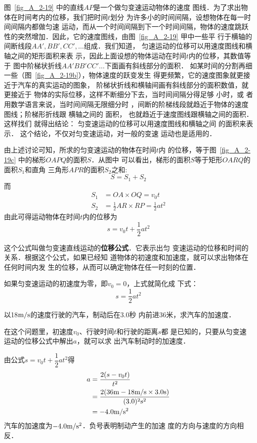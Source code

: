     图~\ref{fig_A_2-19} 中的直线$AP$是一个做匀变速运动物体的速度
图线．为了求出物体在时间考内的位移，我们把时间$t$划分
为许多小的时间间隔，设想物体在每一时间间隔内都做匀速
运动，而从一个时间间隔到下一个时间间隔，物体的速度跳跃
性的突然增加．因此，它的速度图线，由图~\ref{fig_A_2-19} 甲中一些平
行于横轴的间断线段$AA',BB',CC',\ldots$组成．我们知道，
匀速运动的位移可以用速度图线和横轴之间的矩形面积来表
示，因此上面设想的物体运动在时间$t$内的位移，其数值等于
图中阶梯状折线$AA'BB'CC'\ldots$下面画有斜线部分的面积．
如某时间的分割再细一些（图~\ref{fig_A_2-19b}），物体速度的跃变发生
得更频繁，它的速度图象就更接近于汽车的真实运动的图象，
阶梯状折线和横轴间画有斜线部分的面积数值，就更接近于
物体的实际位移，这样不断细分下去，当时间间隔分得足够
小时，或
者用数学语言来说，当时间间隔无限细分时
，间断的阶梯线段就趋近于物体的速度图线；阶梯形折线跟
横轴之间的
面积，
也就趋近于速度图线跟横轴之间的面积．这样找们
就得出结论：
匀变速运动的位移可以用速度图线和横轴之间
的面积来表示．
这个结论，不仅对匀变速运动，对一般的变速
运动也是适用的．

由上述讨论可知，所求的匀变速运动的物体在时间$t$内
的位移，等于图~\ref{fig_A_2-19c} 中的梯形$OAPQ$的面积$S$．从图中
可以看出，梯形的面积$S$等于矩形$OARQ$的面积$S_1$和直角
三角形$APR$的面积$S_2$之和:
\[S=S_1+S_2\]
而
 \[\begin{split}
S_1&=OA\times OQ=v_0 t\\
S_2&=\frac{1}{2}AR\times RP=\frac{1}{2}at^2
\end{split}\]
由此可得运动物体在时间$t$内的位移为
\[s=v_0t+\frac{1}{2}at^2 \]

    这个公式叫做匀变速直线运动的\textbf{位移公式}．它表示出匀
变速运动的位移和时间的关系．根据这个公式，如果已经知
道物体的初速度和加速度，就可以求出物体在任何时间内发
生的位移，从而可以确定物体在任一时刻的位置．

    如果匀变速运动的初速度为零，即$v_0=0$，上式就简化成
下式：
\[s=\frac{1}{2}at^2  \]

\begin{example}
以18$\text{m}/\text{s}$的速度行驶的汽车，制动后在3.0秒
内前进36米，求汽车的加速度．
\end{example}

\begin{solution}
    在这个问题里，初速度$v_0$、行驶时间$t$和行驶的距离$s$都
是已知的，只要从匀变速运动的位移公式中解出$a$，就可以求
出汽车制动时的加速度．

由公式$s=v_0t+\dfrac{1}{2}at^2$得
\[\begin{split}
a&=\frac{2(s-v_0t)}{t^2}\\
&=\frac{2(36{\rm m}-18\text{m}/\text{s}\times 3.0{\rm s})}{(3.0)^2{\rm s}^2}\\
&=-4.0\text{m}/\text{s}^2
\end{split} \]
    汽车的加速度为$-4.0\text{m}/\text{s}^2$．负号表明制动产生的加速
度的方向与速度的方向相反．

\end{solution}

